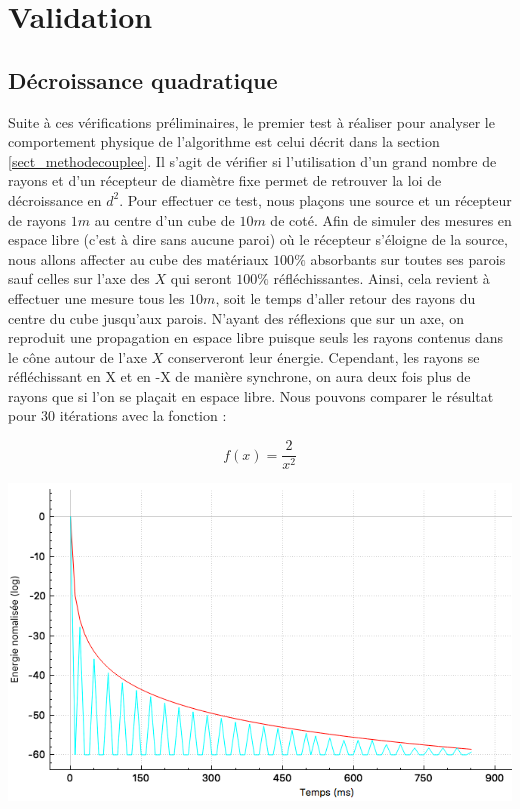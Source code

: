 \begin{figureth}
\begin{subfigureth}{0.45\textwidth}
		\caption{Propagation des rayons depuis les sources-images vers le récepteur à l'ordre 0 et 1  (100000 rayons au total)}
		\label{testBeam2}
	\end{subfigureth}
\end{figureth}



\section{Validation}

\subsection{Décroissance quadratique}
Suite à ces vérifications préliminaires, le premier test à réaliser pour analyser le comportement physique de l'algorithme est celui décrit dans la section \ref{sect_methodecouplee}. Il s'agit de vérifier si l'utilisation d'un grand nombre de rayons et d'un récepteur de diamètre fixe permet de retrouver la loi de décroissance en $d^2$. Pour effectuer ce test, nous plaçons une source et un récepteur de rayons $1m$ au centre d'un cube de $10m$ de coté. Afin de simuler des mesures en espace libre (c'est à dire sans aucune paroi) où le récepteur s'éloigne de la source, nous allons affecter au cube des matériaux $100\%$ absorbants sur toutes ses parois sauf celles sur l'axe des $X$ qui seront $100\%$ réfléchissantes. Ainsi, cela revient à effectuer une mesure tous les $10m$, soit le temps d'aller retour des rayons du centre du cube jusqu'aux parois. N'ayant des réflexions que sur un axe, on reproduit une propagation en espace libre puisque seuls les rayons contenus dans le cône autour de l'axe $X$ conserveront leur énergie. Cependant, les rayons se réfléchissant en X et en -X de manière synchrone, on aura deux fois plus de rayons que si l'on se plaçait en espace libre. Nous pouvons comparer le résultat pour 30 itérations avec la fonction :

\begin{equation*}
f(x) = \frac{2}{x^2}
\end{equation*}

\begin{figureth}
	\includegraphics[width=0.8\linewidth]{images/test1}
	\caption{Réponse impulsionnelle en espace libre pour 3 millions de rayons (bleu) échantillonnée à 100Hz et fonction $f(x)=\frac{2}{x^2}$ (rouge)}
	\label{test1}
\end{figureth}


